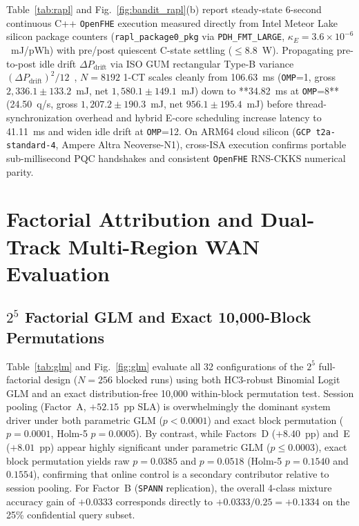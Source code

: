 \documentclass[10pt,journal,compsoc]{IEEEtran}
\begin{document}
Table~\ref{tab:rapl} and Fig.~\ref{fig:bandit_rapl}(b) report steady-state 6-second continuous C++ \texttt{OpenFHE} execution measured directly from Intel Meteor Lake silicon package counters (\nolinkurl{rapl_package0_pkg} via \nolinkurl{PDH_FMT_LARGE}, $\kappa_E = 3.6 \times 10^{-6}$~mJ/pWh) with pre/post quiescent C-state settling ($\le 8.8$~W). Propagating pre-to-post idle drift $\Delta P_{\text{drift}}$ via ISO GUM rectangular Type-B variance $(\Delta P_{\text{drift}})^2/12$~\cite{iso_gum_2008}, $N=8192$ 1-CT scales cleanly from 106.63~ms (\texttt{OMP}=1, gross $2,336.1 \pm 133.2$~mJ, net $1,580.1 \pm 149.1$~mJ) down to **34.82~ms at \texttt{OMP}=8** (24.50~q/s, gross $1,207.2 \pm 190.3$~mJ, net $956.1 \pm 195.4$~mJ) before thread-synchronization overhead and hybrid E-core scheduling increase latency to 41.11~ms and widen idle drift at \texttt{OMP}=12. On ARM64 cloud silicon (\texttt{GCP t2a-standard-4}, Ampere Altra Neoverse-N1), cross-ISA execution confirms portable sub-millisecond PQC handshakes and consistent \texttt{OpenFHE} RNS-CKKS numerical parity.

\section{Factorial Attribution and Dual-Track Multi-Region WAN Evaluation}
\subsection{\texorpdfstring{$2^5$}{2\textasciicircum 5} Factorial GLM and Exact 10,000-Block Permutations}
Table~\ref{tab:glm} and Fig.~\ref{fig:glm} evaluate all 32 configurations of the $2^5$ full-factorial design ($N=256$ blocked runs) using both HC3-robust Binomial Logit GLM and an exact distribution-free 10,000 within-block permutation test. Session pooling (Factor~A, $+52.15$~pp SLA) is overwhelmingly the dominant system driver under both parametric GLM ($p < 0.0001$) and exact block permutation ($p = 0.0001$, Holm-5 $p = 0.0005$). By contrast, while Factors~D ($+8.40$~pp) and~E ($+8.01$~pp) appear highly significant under parametric GLM ($p \le 0.0003$), exact block permutation yields raw $p = 0.0385$ and $p = 0.0518$ (Holm-5 $p = 0.1540$ and $0.1554$), confirming that online control is a secondary contributor relative to session pooling. For Factor~B (\texttt{SPANN} replication), the overall 4-class mixture accuracy gain of $+0.0333$ corresponds directly to $+0.0333 / 0.25 = +0.1334$ on the 25\% confidential query subset.
\end{document}
